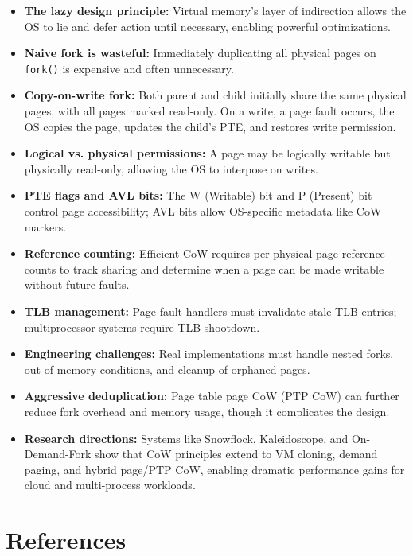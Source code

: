 \documentclass[11pt]{article}
\begin{document}
\begin{itemize}
    \item \textbf{The lazy design principle:} Virtual memory's layer of indirection allows the OS to lie and defer action until necessary, enabling powerful optimizations.
    \item \textbf{Naive fork is wasteful:} Immediately duplicating all physical pages on \texttt{fork()} is expensive and often unnecessary.
    \item \textbf{Copy-on-write fork:} Both parent and child initially share the same physical pages, with all pages marked read-only. On a write, a page fault occurs, the OS copies the page, updates the child's PTE, and restores write permission.
    \item \textbf{Logical vs. physical permissions:} A page may be logically writable but physically read-only, allowing the OS to interpose on writes.
    \item \textbf{PTE flags and AVL bits:} The W (Writable) bit and P (Present) bit control page accessibility; AVL bits allow OS-specific metadata like CoW markers.
    \item \textbf{Reference counting:} Efficient CoW requires per-physical-page reference counts to track sharing and determine when a page can be made writable without future faults.
    \item \textbf{TLB management:} Page fault handlers must invalidate stale TLB entries; multiprocessor systems require TLB shootdown.
    \item \textbf{Engineering challenges:} Real implementations must handle nested forks, out-of-memory conditions, and cleanup of orphaned pages.
    \item \textbf{Aggressive deduplication:} Page table page CoW (PTP CoW) can further reduce fork overhead and memory usage, though it complicates the design.
    \item \textbf{Research directions:} Systems like Snowflock, Kaleidoscope, and On-Demand-Fork show that CoW principles extend to VM cloning, demand paging, and hybrid page/PTP CoW, enabling dramatic performance gains for cloud and multi-process workloads.
\end{itemize}

\section{References}
\end{document}
